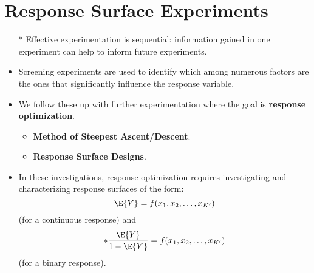 \section{Response Surface Experiments}
\begin{itemize}
    \item[*] Effective experimentation is sequential: information gained in one experiment can help to inform future
        experiments.
    \item Screening experiments are used to identify which among numerous factors are the ones that
          significantly influence the response variable.
    \item We follow these up with further experimentation where the goal is \textbf{response optimization}.
          \begin{itemize}
              \item \textbf{Method of Steepest Ascent/Descent}.
              \item \textbf{Response Surface Designs}.
          \end{itemize}
    \item In these investigations, response optimization requires investigating and characterizing response surfaces of the form:
          \[ \E{Y}=f(x_1,x_2,\ldots,x_{K^\prime}) \]
          (for a continuous response) and
          \[ \log*{\frac{\E{Y}}{1-\E{Y}}}=f(x_1,x_2,\ldots,x_{K^\prime}) \]
          (for a binary response).
\end{itemize}
